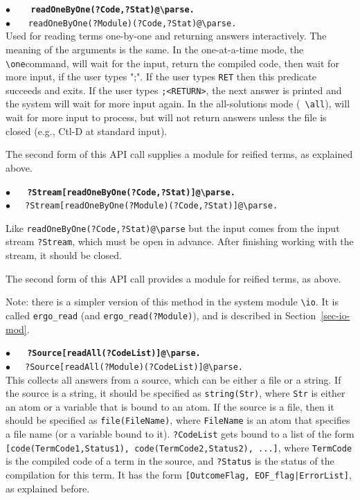 \documentclass[11pt]{article}
\newcommand{\bs}{\textbackslash}
\begin{document}
\noindent
\textbf{$\bullet$~~~ \tt  readOneByOne(?Code,?Stat)@\bs{}parse.} ~~\\
{$\bullet$~~~ \tt  readOneByOne(?Module)(?Code,?Stat)@\bs{}parse.} ~~\\
Used for reading terms one-by-one and returning answers interactively.
The meaning of the arguments is the same.  In the one-at-a-time mode,
the {\tt \bs{}one}command, will wait for the input, return the compiled code, then wait for
more input, if the user types ";". If the user types {\tt RET} then this
predicate succeeds and exits. If the user types \texttt{;<RETURN>}, the next answer is printed and the system will wait for more input again.
   In the all-solutions mode ({\tt
  \bs{}all}), will wait for more input to process, but will not return
answers unless the file is closed (e.g., Ctl-D at standard input).

\noindent
The second form of this API call supplies a module for reified terms, as explained above.

\noindent
\textbf{$\bullet$~~~\tt  ?Stream[readOneByOne(?Code,?Stat)]@\bs{}parse.} ~~\\
{$\bullet$~~~\tt  ?Stream[readOneByOne(?Module)(?Code,?Stat)]@\bs{}parse.}

\noindent
Like \texttt{readOneByOne(?Code,?Stat)@\bs{}parse}  but the input comes from
the input stream \texttt{?Stream}, which must be open in advance.
After finishing working with the stream, it should be closed. 

\noindent
The second form of this API call provides a module for reified terms, as above.

\noindent
Note: there is a simpler version of this method in the system module
\texttt{\bs{}io}. It is called
\texttt{ergo\_read}
(and
\texttt{ergo\_read(?Module)}),
and is described in Section~\ref{sec-io-mod}.

\noindent
\textbf{$\bullet$~~~\tt  ?Source[readAll(?CodeList)]@\bs{}parse.}~~\\
{$\bullet$~~~\tt ?Source[readAll(?Module)(?CodeList)]@\bs{}parse.}~~\\
This collects all answers from a source, which can be either a file or a
string. If the source is a string, it should be
specified as {\tt string(Str)}, where {\tt Str} is either an atom or a
variable that is bound to an atom. If the source is a file, then it should
be specified as {\tt file(FileName)}, where {\tt FileName} is an atom
that specifies a file name (or a variable bound to it).
{\tt ?CodeList} gets bound to a list
of the form {\tt [code(TermCode1,Status1), code(TermCode2,Status2),
  ...]}, where  
{\tt TermCode} is the compiled code of a term in the source, and
{\tt ?Status}  is the status of the compilation for this term. It has the
form {\tt [OutcomeFlag, EOF\_flag|ErrorList]}, as explained before.
\end{document}
